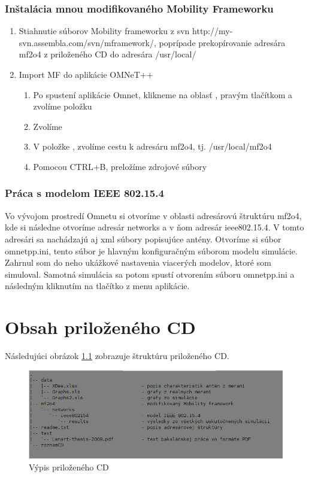 \documentclass[11pt,twoside,a4paper]{book}
\begin{document}
\subsection{Inštalácia mnou modifikovaného Mobility Frameworku}
\begin{enumerate}
 \item Stiahnutie súborov Mobility frameworku z svn http://my-svn.assembla.com/svn/mframework/, poprípade prekopírovanie adresára mf2o4 z priloženého CD do adresára /usr/local/
 \item Import MF do aplikácie OMNeT++
  \begin{enumerate}
   \item Po spustení aplikácie Omnet, klikneme na oblasť , pravým tlačítkom a zvolíme položku 
   \item Zvolíme 
   \item V položke , zvolíme cestu k adresáru mf2o4, tj. /usr/local/mf2o4
   \item Pomocou CTRL+B, preložíme zdrojové súbory
  \end{enumerate}  
\end{enumerate}

\subsection{Práca s modelom IEEE 802.15.4}
Vo vývojom prostredí Omnetu si otvoríme v oblasti  adresárovú štruktúru mf2o4, kde si následne otvoríme adresár networks a v ňom adresár ieee802.15.4. V tomto adresári sa nachádzajú aj xml súbory popisujúce antény. Otvoríme si súbor omnetpp.ini, tento súbor je hlavným konfiguračným súborom modelu simulácie. Zahrnul som do neho ukážkové nastavenia viacerých modelov, ktoré som simuloval. Samotná simulácia sa potom spustí otvorením súboru omnetpp.ini a následným kliknutím na tlačítko  z menu aplikácie.

\chapter{Obsah priloženého CD}

Následujúci obrázok \ref{fig:zoznamCD} zobrazuje štruktúru priloženého CD.

\begin{figure}[h]
\begin{center}
\includegraphics[width=14cm]{./figures/zoznamCD.png}
\caption{Výpis priloženého CD}
\label{fig:zoznamCD}
\end{center}
\end{figure}
\end{document}
